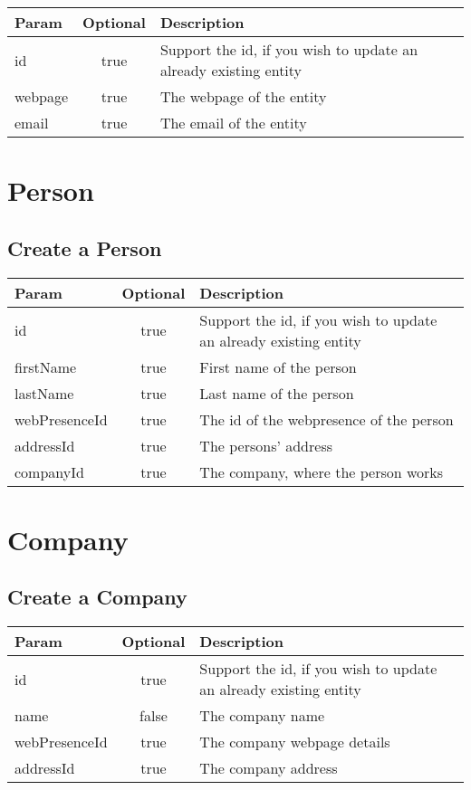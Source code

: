 \documentclass[a4paper,10pt]{report}
\newcommand{\thead}[1]{\textbf{\large{#1}}}
\begin{document}
\begin{tabular}{l | c | l}
\thead{Param} & \thead{Optional} & \thead{Description}\\
\hline
id & true & Support the id, if you wish to update an already existing entity\\
webpage & true & The webpage of the entity\\
email & true & The email of the entity \\
 
\end{tabular} 

\section{Person}
\label{sec:Person}

\subsection{Create a Person}
\label{s:cPerson}

\begin{tabular}{l | c | l}
\thead{Param} & \thead{Optional} & \thead{Description}\\
\hline
id & true & Support the id, if you wish to update an already existing entity\\
firstName & true & First name of the person\\
lastName & true & Last name of the person\\
webPresenceId & true & The id of the webpresence of the person\\
addressId & true & The persons' address\\
companyId & true & The company, where the person works\\
 
\end{tabular} 


\section{Company}
\label{sec:Company}

\subsection{Create a Company}
\label{s:cCompany}

\begin{tabular}{l | c | l}
\thead{Param} & \thead{Optional} & \thead{Description}\\
\hline
id & true & Support the id, if you wish to update an already existing entity\\
name & false & The company name\\
webPresenceId & true & The company webpage details\\
addressId & true & The company address\\
 
\end{tabular} 
\end{document}
